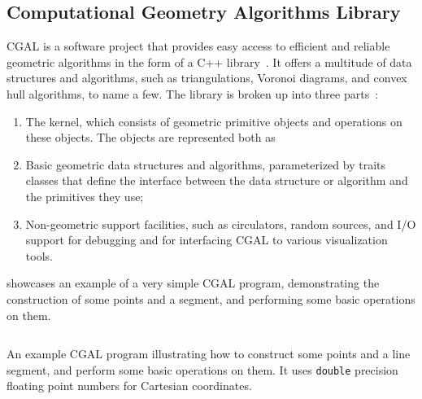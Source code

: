 \subsection{Computational Geometry Algorithms Library}%
\label{sec:solution.impl.cgal}

\Ac{CGAL} is a software project that provides easy access to efficient and
reliable geometric algorithms in the form of a C++
library~\cite{CGAL:5.3:Project}.  It offers a multitude of data structures and
algorithms, such as triangulations, Voronoi diagrams, and convex hull
algorithms, to name a few.  The library is broken up into three
parts~\cite{CGAL:5.3:23LGK}:
\begin{enumerate}
  \item The kernel, which consists of geometric primitive objects and operations
  on these objects.  The objects are represented both as
  \item Basic geometric data structures and algorithms, parameterized by traits
  classes that define the interface between the data structure or algorithm and
  the primitives they use;
  \item Non-geometric support facilities, such as circulators, random sources,
  and I/O support for debugging and for interfacing \ac{CGAL} to various
  visualization tools.
\end{enumerate}

 showcases an example of a very simple
\ac{CGAL} program, demonstrating the construction of some points and a segment,
and performing some basic operations on them.

\begin{listing}[!htb]
  \inputminted{cpp}{cpp/points_and_segments.cpp}
  \caption[CGAL: Three points and one segment]{
    An example CGAL program illustrating how to construct some points and a line
    segment, and perform some basic operations on them.  It uses \texttt{double}
    precision floating point numbers for Cartesian coordinates.}%
  \label{lst:solution.impl.cgal.pas}
\end{listing}

